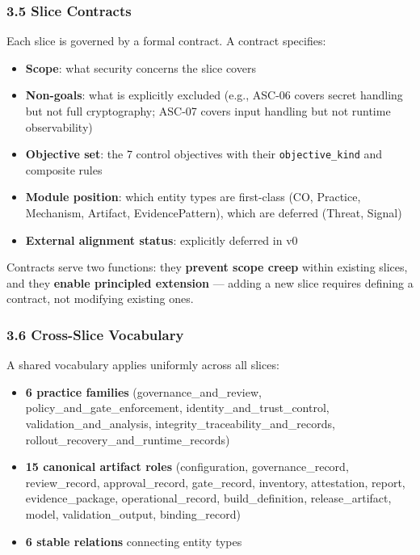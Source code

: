\documentclass[
]{article}
\providecommand{\tightlist}{%
  \setlength{\itemsep}{0pt}\setlength{\parskip}{0pt}}
\begin{document}
\subsubsection{3.5 Slice Contracts}\label{slice-contracts}

Each slice is governed by a formal contract. A contract specifies:

\begin{itemize}
\tightlist
\item
  \textbf{Scope}: what security concerns the slice covers
\item
  \textbf{Non-goals}: what is explicitly excluded (e.g., ASC-06 covers
  secret handling but not full cryptography; ASC-07 covers input
  handling but not runtime observability)
\item
  \textbf{Objective set}: the 7 control objectives with their
  \texttt{objective\_kind} and composite rules
\item
  \textbf{Module position}: which entity types are first-class (CO,
  Practice, Mechanism, Artifact, EvidencePattern), which are deferred
  (Threat, Signal)
\item
  \textbf{External alignment status}: explicitly deferred in v0
\end{itemize}

Contracts serve two functions: they \textbf{prevent scope creep} within
existing slices, and they \textbf{enable principled extension} ---
adding a new slice requires defining a contract, not modifying existing
ones.

\subsubsection{3.6 Cross-Slice Vocabulary}\label{cross-slice-vocabulary}

A shared vocabulary applies uniformly across all slices:

\begin{itemize}
\tightlist
\item
  \textbf{6 practice families} (governance\_and\_review,
  policy\_and\_gate\_enforcement, identity\_and\_trust\_control,
  validation\_and\_analysis, integrity\_traceability\_and\_records,
  rollout\_recovery\_and\_runtime\_records)
\item
  \textbf{15 canonical artifact roles} (configuration,
  governance\_record, review\_record, approval\_record, gate\_record,
  inventory, attestation, report, evidence\_package,
  operational\_record, build\_definition, release\_artifact, model,
  validation\_output, binding\_record)
\item
  \textbf{6 stable relations} connecting entity types
\end{itemize}
\end{document}
